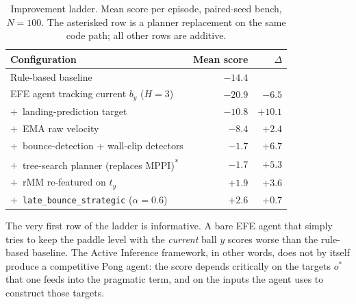 \documentclass[runningheads]{llncs}
\begin{document}
\begin{table}[t]
\caption{Improvement ladder. Mean score per episode, paired-seed
bench, $N{=}100$. The asterisked row is a planner replacement on
the same code path; all other rows are additive.}\label{tab:ladder}
\centering
\begin{tabular}{lrr}
\toprule
Configuration & Mean score & $\Delta$ \\
\midrule
Rule-based baseline                                              & $-14.4$ &        \\
EFE agent tracking current $b_y$ ($H{=}3$)                       & $-20.9$ & $-6.5$ \\
$+\,$ landing-prediction target                                  & $-10.8$ & $+10.1$\\
$+\,$ EMA raw velocity                                           & $-8.4$  & $+2.4$ \\
$+\,$ bounce-detection + wall-clip detectors                     & $-1.7$  & $+6.7$ \\
$+\,$ tree-search planner (replaces MPPI)\textsuperscript{*}     & $-1.7$  & $+5.3$ \\
$+\,$ rMM re-featured on $t_y$                                   & $+1.9$  & $+3.6$ \\
$+\,$ \texttt{late\_bounce\_strategic} ($\alpha{=}0.6$)          & $+2.6$  & $+0.7$ \\
\bottomrule
\end{tabular}
\end{table}

The very first row of the ladder is informative. A bare EFE agent
that simply tries to keep the paddle level with the \emph{current}
ball $y$ scores worse than the rule-based baseline. The Active
Inference framework, in other words, does not by itself produce a
competitive Pong agent: the score depends critically on the targets
$o^*$ that one feeds into the pragmatic term, and on the inputs
the agent uses to construct those targets.
\end{document}
